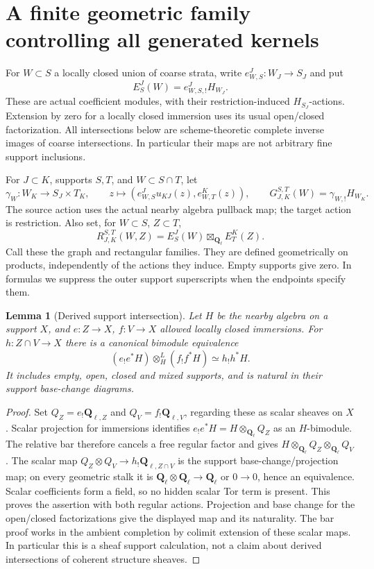 \documentclass[11pt]{article}
\newtheorem{lemma}[proposition]{Lemma}
\theoremstyle{definition}
\theoremstyle{remark}
\newcommand{\Q}{\mathbf Q_\ell}
\begin{document}
\section{A finite geometric family controlling all generated kernels}
\label{sec:kernel-closure}
For $W\subset S$ a locally closed union of coarse strata, write
$e^J_{W,S}:W_J\to S_J$ and put
\[
 E^J_S(W)=e^J_{W,S,!}H_{W_J}.
\]
These are actual coefficient modules, with their restriction-induced
$H_{S_J}$-actions.  Extension by zero for a locally closed immersion
uses its usual open/closed factorization.  All intersections below
are scheme-theoretic complete inverse images of coarse intersections.
In particular their maps are not arbitrary fine support inclusions.

For $J\subset K$, supports $S,T$, and $W\subset S\cap T$, let
\[
 \gamma_W:W_K\longrightarrow S_J\times T_K,
 \qquad z\longmapsto(e^J_{W,S}u_{KJ}(z),e^K_{W,T}(z)),
 \qquad G_{J,K}^{S,T}(W)=\gamma_{W,!}H_{W_K}.
\]
The source action uses the actual nearby algebra pullback map; the
target action is restriction.  Also set, for $W\subset S$, $Z\subset T$,
\[
 R_{J,K}^{S,T}(W,Z)=E^J_S(W)\boxtimes_{\Q}E^K_T(Z).
\]
Call these the graph and rectangular families.  They are defined
geometrically on products, independently of the actions they induce.
Empty supports give zero.  In formulas we suppress the outer support
superscripts when the endpoints specify them.

\begin{lemma}[Derived support intersection]
\label{lem:support-intersection}
Let $H$ be the nearby algebra on a support $X$, and $e:Z\to X$,
$f:V\to X$ allowed locally closed immersions.  For
$h:Z\cap V\to X$ there is a canonical bimodule equivalence
\[
 (e_!e^*H)\otimes_H^L(f_!f^*H)\simeq h_!h^*H.
\]
It includes empty, open, closed and mixed supports, and is natural
in their support base-change diagrams.
\end{lemma}
\begin{proof}
Set $Q_Z=e_!\mathbf Q_{\ell,Z}$ and $Q_V=f_!\mathbf Q_{\ell,V}$, regarding these as scalar
sheaves on $X$.  Scalar projection for immersions identifies
$e_!e^*H=H\otimes_{\Q} Q_Z$ as an $H$-bimodule.  The relative bar
therefore cancels a free regular factor and gives
$H\otimes_{\Q} Q_Z\otimes_{\Q} Q_V$.
The scalar map $Q_Z\otimes Q_V\to h_!\mathbf Q_{\ell,Z\cap V}$ is the
support base-change/projection map; on every geometric stalk it is
$\Q\otimes\Q\to\Q$ or $0\to0$, hence an equivalence.
Scalar coefficients form a field, so no hidden scalar Tor term is
present.  This proves the assertion with both regular actions.
Projection and base change for the open/closed factorizations give
the displayed map and its naturality.  The bar proof works in the
ambient completion by colimit extension of these scalar maps.
In particular this is a sheaf support calculation, not a claim
about derived intersections of coherent structure sheaves.
\end{proof}
\end{document}
